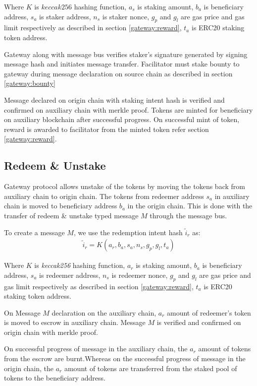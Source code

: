\documentclass[12pt,a4paper]{article}
\begin{document}
Where $K$ is $keccak256$ hashing function, $a_s$ is staking amount, $b_a$ is beneficiary address, $s_a$ is staker address, $n_s$ is staker nonce, $g_p$ and $g_l$ are gas price and gas limit respectively as described in section \ref{gateway:reward}, $t_a$ is ERC20 staking token address. 

Gateway along with message bus verifies staker’s signature generated by signing message hash and initiates message transfer.
Facilitator must stake bounty to gateway during message declaration on source chain as described in section \ref{gateway:bounty} 

Message declared on origin chain with staking intent hash is verified and confirmed on auxiliary chain with merkle proof. 
Tokens are minted for beneficiary on auxiliary blockchain after successful progress. 
On successful mint of token, reward is awarded to facilitator from the minted token refer section \ref{gateway:reward}.

\subsection{Redeem \& Unstake}\label{gateway:redeemunstake}

Gateway protocol allows unstake of the tokens by moving the tokens back from auxiliary chain to origin chain. 
The tokens from redeemer address $s_a$ in auxiliary chain is moved to beneficiary address $b_a$ in the origin chain. 
This is done with the transfer of redeem \& unstake typed message $M$ through the message bus.

To create a message $M$, we use the redemption intent hash $\tilde{i}_r$ as:
 \begin{align}
 \tilde{i}_r = K(a_r,b_a,s_a,n_s,g_p,g_l,t_a )    
 \end{align}

Where $K$ is \emph{keccak256} hashing function, $a_r$ is staking amount, $b_a$ is beneficiary address, $s_a$ is redeemer address, $n_s$ is redeemer nonce, $g_p$ and $g_l$ are gas price and gas limit respectively as described in section \ref{gateway:reward}, $t_a$ is ERC20 staking token address. 

On Message $M$ declaration on the auxiliary chain, $a_r$ amount of redeemer's token is moved to escrow in auxiliary chain. Message $M$ is verified and confirmed on origin chain with merkle proof.

On successful progress of message in the auxiliary chain, the $a_r$ amount of tokens from the escrow are burnt.Whereas on the successful progress of message in the origin chain, the $a_r$ amount of tokens are transferred from the staked pool of tokens to the beneficiary address.
\end{document}
